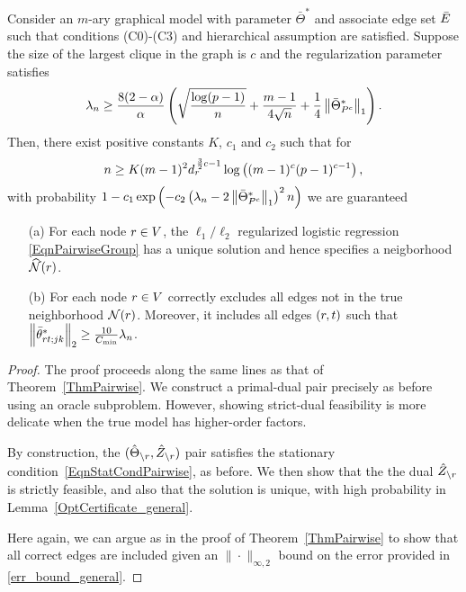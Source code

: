 \begin{theorem}
Consider an $m$-ary graphical model with parameter $\bar{\Theta}^*$ and associate edge set $\bar{E}$ such that conditions (C0)-(C3) and hierarchical assumption are satisfied. Suppose the size of the largest clique in the graph is $c$ and the regularization parameter satisfies
\begin{equation}
\lambda_n\geq \frac{8(2-\alpha)}{\alpha}\left(\sqrt{\frac{\log(p-1)}{n}}+\frac{m-1}{4\sqrt{n}} +\frac{1}{4}\left\|\bar{\Theta}^*_{P^c}\right\|_{1}\right).
\nonumber
\end{equation}
Then, there exist positive constants $K$, $c_1$ and $c_2$ such that for 
\begin{equation}
n\geq K (m-1)^2 d_{r}^{\,\frac{3}{2}c-1} \log\left((m-1)^c(p-1)^{c-1}\right),
\nonumber
\end{equation}
with probability $1-c_1\exp\left(-c_2\left(\lambda_n-2\left\|\bar{\Theta}^*_{P^c}\right\|_{1}\right)^2n\right)$ we are guaranteed
\begin{itemize}
\item [(a)] For each node $r\in V$, the $\ell_1/\ell_2$ regularized logistic regression \eqref{EqnPairwiseGroup} has a unique solution and hence specifies a neigborhood $\widehat{\mathcal{N}}(r)$.
\item [(b)] For each node $r\in V$ correctly excludes all edges not in the true neighborhood $\mathcal{N}(r)$. Moreover, it includes all edges $(r,t)$ such that $\left\|\bar{\theta}^*_{r t;jk}\right\|_{2}\geq\frac{10}{C_{\min}}\lambda_n$.
\end{itemize}
\end{theorem}

\begin{proof}
The proof proceeds along the same lines as that of Theorem~\ref{ThmPairwise}. We construct a primal-dual pair precisely as before using an oracle subproblem. However, showing
strict-dual feasibility is more delicate when the true model has higher-order factors.

By construction, the $(\hat{\Theta}_{\backslash r}, \hat{Z}_{\backslash r})$ pair satisfies the stationary condition~\eqref{EqnStatCondPairwise}, as before. We then show that the the dual 
$\hat{Z}_{\backslash r}$ is strictly feasible, and also that the solution is unique, with high probability in Lemma~\ref{OptCertificate_general}.

Here again, we can argue as in the proof of Theorem~\ref{ThmPairwise} to show that  all correct edges are included given an $\|\cdot\|_{\infty,2}$ bound on the error provided in \eqref{err_bound_general}.
\end{proof}

\vspace{-0.5cm}
